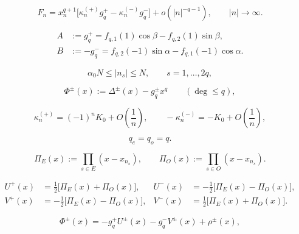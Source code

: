 \documentclass[10pt,a4paper]{amsart}
\begin{document}
\begin{equation}\label{eq:Fn-asymp}
F_n=x_n^{q+1}\bigl[\kappa_n^{(+)}g_q^+-\kappa_n^{(-)}g_q^-\bigr]+o(|n|^{-q-1}),
\qquad |n|\to\infty.
\end{equation}

\begin{equation}\label{eq:AB}
\begin{aligned}
A&:=g_q^+ = f_{q,1}(1)\cos\beta - f_{q,2}(1)\sin\beta,\\
B&:=-g_q^- = f_{q,2}(-1)\sin\alpha - f_{q,1}(-1)\cos\alpha.
\end{aligned}
\end{equation}

\begin{equation}\label{eq:ns-range}
\alpha_0 N\leq |n_s|\leq N,
\qquad
s=1,\dots,2q,
\end{equation}

\begin{equation}\label{eq:Phi-def}
\Phi^\pm(x):=\Delta^\pm(x)-g_q^\pm x^q\qquad(\deg\le q),
\end{equation}

\begin{equation}\label{eq:kappa-leading}
\kappa_n^{(+)}
=
(-1)^nK_0+O\!\left(\frac{1}{n}\right),
\qquad
-\kappa_n^{(-)}
=
-K_0+O\!\left(\frac{1}{n}\right),
\end{equation}

\begin{equation}\label{eq:parity-balance}
q_e=q_o=q.
\end{equation}

\begin{equation}\label{eq:Pi-EO}
\Pi_E(x):=\prod_{s\in E}(x-x_{n_s}),
\qquad
\Pi_O(x):=\prod_{s\in O}(x-x_{n_s}).
\end{equation}

\begin{equation}\label{eq:UV-explicit}
\begin{aligned}
U^+(x)
&=
\frac{1}{2}\bigl[\Pi_E(x)+\Pi_O(x)\bigr],
&
U^-(x)
&=
-\frac{1}{2}\bigl[\Pi_E(x)-\Pi_O(x)\bigr],
\\[2pt]
V^+(x)
&=
-\frac{1}{2}\bigl[\Pi_E(x)-\Pi_O(x)\bigr],
&
V^-(x)
&=
\frac{1}{2}\bigl[\Pi_E(x)+\Pi_O(x)\bigr].
\end{aligned}
\end{equation}

\begin{equation}\label{eq:Phi-decomp-2}
\Phi^\pm(x)
=
-g_q^+U^\pm(x)-g_q^-V^\pm(x)+\rho^\pm(x),
\end{equation}
\end{document}
